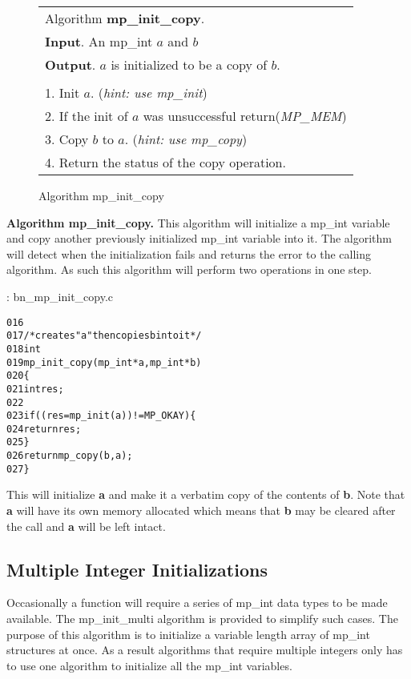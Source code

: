 \documentclass[b5paper]{book}
\begin{document}
\begin{figure}[here]
\begin{center}
\begin{tabular}{l}
\hline Algorithm \textbf{mp\_init\_copy}. \\
\textbf{Input}.   An mp\_int $a$ and $b$\\
\textbf{Output}.  $a$ is initialized to be a copy of $b$. \\
\hline \\
1.  Init $a$.  (\textit{hint: use mp\_init}) \\
2.  If the init of $a$ was unsuccessful return(\textit{MP\_MEM}) \\
3.  Copy $b$ to $a$.  (\textit{hint: use mp\_copy}) \\
4.  Return the status of the copy operation. \\
\hline
\end{tabular}
\end{center}
\caption{Algorithm mp\_init\_copy}
\end{figure}

\textbf{Algorithm mp\_init\_copy.}
This algorithm will initialize a mp\_int variable and copy another previously initialized mp\_int variable into it.  The algorithm will
detect when the initialization fails and returns the error to the calling algorithm.  As such this algorithm will perform two operations
in one step.  

\vspace{+3mm}\begin{small}
\hspace{-5.1mm}{\bf File}: bn\_mp\_init\_copy.c
\vspace{-3mm}
\begin{alltt}
016   
017   /* creates "a" then copies b into it */
018   int
019   mp_init_copy (mp_int * a, mp_int * b)
020   \{
021     int     res;
022   
023     if ((res = mp_init (a)) != MP_OKAY) \{
024       return res;
025     \}
026     return mp_copy (b, a);
027   \}
\end{alltt}
\end{small}

This will initialize \textbf{a} and make it a verbatim copy of the contents of \textbf{b}.  Note that 
\textbf{a} will have its own memory allocated which means that \textbf{b} may be cleared after the call
and \textbf{a} will be left intact.  

\subsection{Multiple Integer Initializations}
Occasionally a function will require a series of mp\_int data types to be made available.  The mp\_init\_multi algorithm
is provided to simplify such cases.  The purpose of this algorithm is to initialize a variable length array of mp\_int 
structures at once.  As a result algorithms that require multiple integers only has to use 
one algorithm to initialize all the mp\_int variables.
\end{document}
